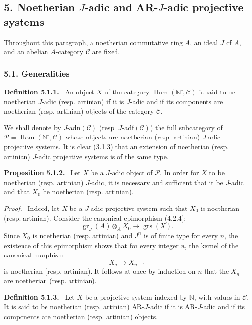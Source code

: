 \documentclass[11pt]{article}
\newenvironment{statement}[1]{\par\medskip\noindent\textbf{#1.}\ }{\par\medskip}
\newenvironment{prooftext}[1][Proof]{\par\noindent\emph{#1.}\ }{\par\medskip}
\DeclareMathOperator{\Hom}{Hom}
\providecommand{\gr}{\operatorname{gr}}
\providecommand{\Hom}{\operatorname{Hom}}
\providecommand{\gr}{\operatorname{gr}}
\providecommand{\gr}{\operatorname{gr}}
\providecommand{\grs}{\operatorname{grs}}
\begin{document}
\subsection*{5. Noetherian \(J\)-adic and AR-\(J\)-adic projective systems}

Throughout this paragraph, a noetherian commutative ring \(A\), an ideal \(J\) of \(A\), and an abelian \(A\)-category \(\mathcal C\) are fixed.

\subsubsection*{5.1. Generalities}

\begin{statement}{Definition 5.1.1}
An object \(X\) of the category \(\Hom(\mathbb N^\circ,\mathcal C)\) is said to be noetherian \(J\)-adic (resp. artinian) if it is \(J\)-adic and if its components are noetherian (resp. artinian) objects of the category \(\mathcal C\).
\end{statement}

We shall denote by \(J\)-adn\((\mathcal C)\) (resp. \(J\)-adf\((\mathcal C)\)) the full subcategory of
\(\mathcal P=\Hom(\mathbb N^\circ,\mathcal C)\) whose objects are noetherian (resp. artinian) \(J\)-adic projective systems. It is clear (3.1.3) that an extension of noetherian (resp. artinian) \(J\)-adic projective systems is of the same type.

\begin{statement}{Proposition 5.1.2}
Let \(X\) be a \(J\)-adic object of \(\mathcal P\). In order for \(X\) to be noetherian (resp. artinian) \(J\)-adic, it is necessary and sufficient that it be \(J\)-adic and that \(X_0\) be noetherian (resp. artinian).
\end{statement}

\begin{prooftext}
Indeed, let \(X\) be a \(J\)-adic projective system such that \(X_0\) is noetherian (resp. artinian). Consider the canonical epimorphism (4.2.4):
\[
\gr_J(A)\otimes_A X_0\longrightarrow \grs(X).
\]
Since \(X_0\) is noetherian (resp. artinian) and \(J^n\) is of finite type for every \(n\), the existence of this epimorphism shows that for every integer \(n\), the kernel of the canonical morphism
\[
X_n\longrightarrow X_{n-1}
\]
is noetherian (resp. artinian). It follows at once by induction on \(n\) that the \(X_n\) are noetherian (resp. artinian).
\end{prooftext}

\begin{statement}{Definition 5.1.3}
Let \(X\) be a projective system indexed by \(\mathbb N\), with values in \(\mathcal C\). It is said to be noetherian (resp. artinian) AR-\(J\)-adic if it is AR-\(J\)-adic and if its components are noetherian (resp. artinian) objects.
\end{statement}
\end{document}
